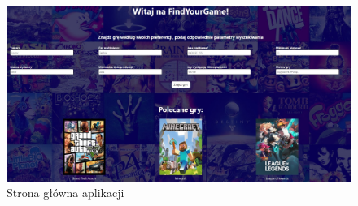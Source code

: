 \begin{figure}[h]
    \centering
    \includegraphics[width=1\linewidth]{./img/stronaglowna.jpg}
    \caption{Strona główna aplikacji}
    \label{fig:StronaGlowna}
\end{figure}

